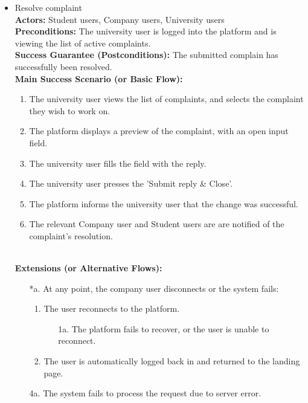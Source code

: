 \begin{itemize}[label={[\textbf{UC}]}, align=left, leftmargin=*]
    \item {} Resolve complaint \\
    \textbf{Actors:} Student users, Company users, University users\\
     \textbf{Preconditions:} The university user is logged into the platform and is viewing the list of active complaints.\\
     \textbf{Success Guarantee (Postconditions):} The submitted complain has successfully been resolved. \\
     \textbf{Main Success Scenario (or Basic Flow):} 
     \begin{enumerate}[label=\arabic*.] 
        \item The university user views the list of complaints, and selects the complaint they wish to work on.
        \item The platform displays a preview of the complaint, with an open input field.
        \item The university user fills the field with the reply.
        \item The university user presses the 'Submit reply \& Close'.
        \item The platform informs the university user that the change was successful.
        \item The relevant Company user and Student users are are notified of the complaint's resolution.
     \end{enumerate} \\

    \textbf{Extensions (or Alternative Flows):} 
    \begin{enumerate}[label=\arabic*.]
        \item[*a.] At any point, the company user disconnects or the system fails:
            \begin{enumerate}[label=\arabic*.]
                \item The user reconnects to the platform.
                    \begin{enumerate}[label=\alph*.]
                        \item[1a.] The platform fails to recover, or the user is unable to reconnect.
                    \end{enumerate}
                 \item The user is automatically logged back in and returned to the landing page.
            \end{enumerate} 
        \item[4a.] The system fails to process the request due to server error.
        \end{enumerate}

\end{itemize}

